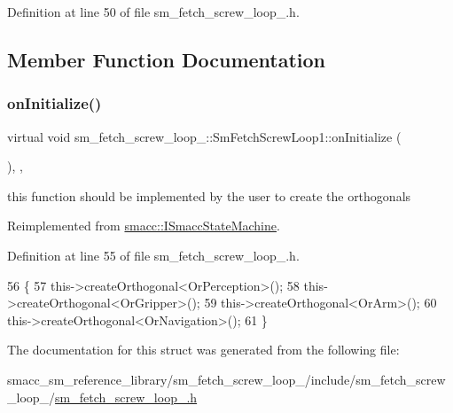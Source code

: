 Definition at line 50 of file sm\+\_\+fetch\+\_\+screw\+\_\+loop\+\_.\+h.



\subsection{Member Function Documentation}
\mbox{\label{structsm__fetch__screw__loop__1_1_1SmFetchScrewLoop1_a0a939505f6e1dbeb48a5284433437dab}} 
\subsubsection{\texorpdfstring{on\+Initialize()}{onInitialize()}}
{\footnotesize\ttfamily virtual void sm\+\_\+fetch\+\_\+screw\+\_\+loop\+\_\+::\+Sm\+Fetch\+Screw\+Loop1\+::on\+Initialize (\begin{DoxyParamCaption}{ }\end{DoxyParamCaption})\hspace{0.3cm}{\ttfamily [inline]}, {\ttfamily [override]}, {\ttfamily [virtual]}}



this function should be implemented by the user to create the orthogonals 



Reimplemented from \hyperlink{classsmacc_1_1ISmaccStateMachine_ac2982c6c8283663e5e1e8a7c82f511ec}{smacc\+::\+I\+Smacc\+State\+Machine}.



Definition at line 55 of file sm\+\_\+fetch\+\_\+screw\+\_\+loop\+\_.\+h.


\begin{DoxyCode}
56         \{
57             this->createOrthogonal<OrPerception>();
58             this->createOrthogonal<OrGripper>();
59             this->createOrthogonal<OrArm>();
60             this->createOrthogonal<OrNavigation>();
61         \}
\end{DoxyCode}


The documentation for this struct was generated from the following file\+:\begin{DoxyCompactItemize}
\item 
smacc\+\_\+sm\+\_\+reference\+\_\+library/sm\+\_\+fetch\+\_\+screw\+\_\+loop\+\_/include/sm\+\_\+fetch\+\_\+screw\+\_\+loop\+\_/\hyperlink{sm__fetch__screw__loop__1_8h}{sm\+\_\+fetch\+\_\+screw\+\_\+loop\+\_.\+h}\end{DoxyCompactItemize}

